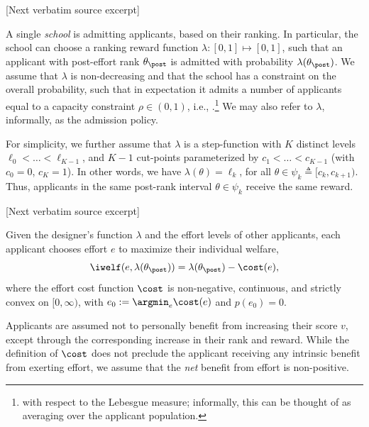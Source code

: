 \documentclass[10pt]{article}
\begin{document}
\begin{ReviewVerbatim}
{[Next verbatim source excerpt]

 A single \textit{school} is admitting applicants, based on their ranking. In particular, the school can choose a ranking reward function $\lambda : [0, 1] \mapsto [0, 1]$, such that an applicant with post-effort rank $\theta_\post$ is admitted with probability $\lambda(\theta_\post)$. We assume that $\lambda$ is non-decreasing and that the school has a constraint on the overall probability, such that in expectation it admits a number of applicants equal to {a} capacity constraint  $\rho \in (0,1)$, i.e., \lledit{$\E_{\theta_\post}[\lambda(\theta_\post)] = \rho $}.\footnote{ with respect to the Lebesgue measure; informally, this can be thought of as averaging over the applicant population.} We may also refer to $\lambda$, informally, as the admission policy.



For simplicity, we further assume that $\lambda$ is a step-function with $K$ distinct levels $\ell_0 < \dots < \ell_{K-1}$, and $K-1$ cut-points parameterized by $c_1< \dots < c_{K-1}$ (with $c_0 = 0$, $c_K = 1$). %
In other words, we have $\lambda(\theta) = \ell_k$, for all $\theta \in \psi_k \triangleq [c_{k}, c_{k+1})$. Thus, applicants in the same post-rank interval $\theta \in \psi_k$ receive the same reward.

[Next verbatim source excerpt]

 Given the designer's function $\lambda$ and the effort levels of other applicants, each applicant chooses effort $e$ to maximize their individual welfare, %
\begin{equation*}
	\iwelf(e, \lambda(\theta_\post)) = \lambda(\theta_\post) - \cost(e),
\end{equation*}
where the effort cost function $\cost$ is non-negative, continuous, and strictly convex {on $[0,\infty)$, with $e_0:=\argmin_e \cost(e)$ and $p(e_0) = 0$.}

Applicants are assumed not to personally benefit from increasing their score $v$, except through the corresponding increase in their rank and reward. While the definition of $\cost$ does not preclude the applicant receiving any intrinsic benefit from exerting effort, we assume that the \emph{net} benefit from effort is non-positive.

}
\end{ReviewVerbatim}
\end{document}
